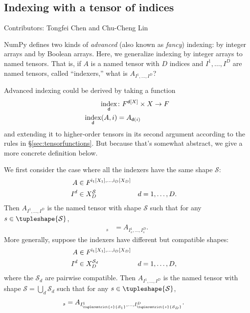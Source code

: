 \subsection{Indexing with a tensor of indices}

Contributors: Tongfei Chen and Chu-Cheng Lin

NumPy defines two kinds of \emph{advanced} (also known as \emph{fancy}) indexing: by integer arrays and by Boolean arrays. Here, we generalize indexing by integer arrays to named tensors. That is, if $A$ is a named tensor with $D$ indices and $I^1, \ldots, I^D$ are named tensors, called ``indexers,'' what is $A_{I^1, \ldots, I^D}$?

Advanced indexing could be derived by taking a function
\begin{align*}
  \nfun{d}{index} &\colon F^{\nset{d}{X}} \times X \rightarrow F \\
  \nfun{d}{index}(A, i) &= A_{\nidx{d}{i}}
\end{align*}
and extending it to higher-order tensors in its second argument according to the rules in \S\ref{sec:tensorfunctions}. But because that's somewhat abstract, we give a more concrete definition below.

We first consider the case where all the indexers have the same shape $\mathcal{S}$:
\begin{align*}
  A &\in F^{\nset{i\sub{1}}{X_1}, \ldots, \nset{i\sub{D}}{X_D}} \\
  I^d &\in X_D^{\mathcal{S}} & d &= 1, \ldots, D.
\end{align*}
Then $A_{I^1, \ldots, I^D}$ is the named tensor with shape $\mathcal{S}$ such that for any $s \in \tupleshape{\mathcal{S}}$,
\begin{align*}
  [A_{I^1, \ldots, I^D}]_s &= A_{I^1_s, \ldots, I^D_s}.
\end{align*}
More generally, suppose the indexers have different but compatible shapes:
\begin{align*}
  A &\in F^{\nset{i\sub{1}}{X_1}, \ldots, \nset{i\sub{D}}{X_D}} \\
  I^d &\in X_D^{\mathcal{S}_d} & d &= 1, \ldots, D,
\end{align*}
where the $\mathcal{S}_d$ are pairwise compatible. Then $A_{I^1, \ldots, I^D}$ is the named tensor with shape $\mathcal{S} = \bigcup_d \mathcal{S}_d$ such that for any $s \in \tupleshape{\mathcal{S}}$,
\begin{align*}
  [A_{I^1, \ldots, I^D}]_s &= A_{I^1_{\tuplerestrict{s}{\mathcal{S}_1}}, \ldots, I^D_{\tuplerestrict{s}{\mathcal{S}_D}}}.
\end{align*}

